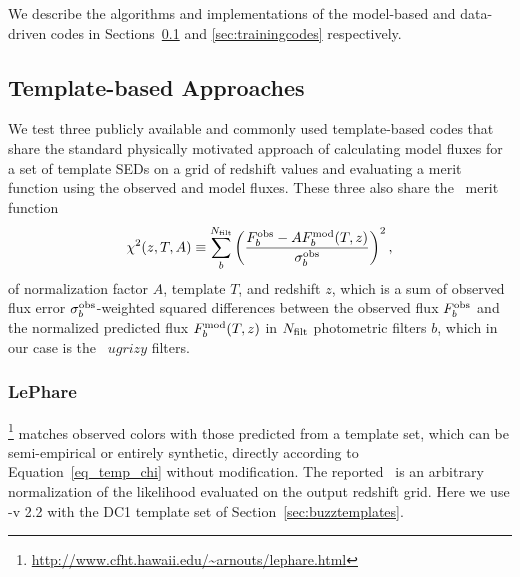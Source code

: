 We describe the algorithms and implementations of the model-based and data-driven codes in Sections~\ref{sec:templatecodes} and \ref{sec:trainingcodes} respectively.

\subsection{Template-based Approaches}
\label{sec:templatecodes}

We test three publicly available and commonly used template-based codes that share the standard physically motivated approach of calculating model fluxes for a set of template SEDs on a grid of redshift values and evaluating a merit function using the observed and model fluxes.
These three also share the \chisq\ merit function
\begin{equation}
	\label{eq_temp_chi}
	\chi^{2}(z, T, A) \equiv \sum_{b}^{N_{\rm{filt}}} \left(\frac{F^{\rm{obs}}_{b} - A F^{\rm{mod}}_{b}(T, z)}{\sigma^{\rm{obs}}_{b}}\right)^{2},
\end{equation}
of normalization factor $A$, template $T$, and redshift $z$, which is a sum of observed flux error $\sigma_{b}^{\rm{obs}}$-weighted squared differences between the observed flux $F^{\rm{obs}}_{b}$ and the normalized predicted flux $F^{\rm{mod}}_{b}(T, z)$ in $N_{\rm{filt}}$ photometric filters $b$, which in our case is the \lsst\ $ugrizy$ filters.

\subsubsection{LePhare}
\label{sec:lephare}

\lephare \footnote{\url{http://www.cfht.hawaii.edu/~arnouts/lephare.html}}\citep[Photometric Analysis for Redshift Estimate,][]{Arnouts:99,Ilbert:06} matches observed colors with those predicted from a template set, which can be semi-empirical or entirely synthetic, directly according to Equation~\ref{eq_temp_chi} without modification.
The reported \pzpdf\ is an arbitrary normalization of the likelihood evaluated on the output redshift grid.
Here we use \lephare-v 2.2 with the DC1 template set of Section~\ref{sec:buzztemplates}.

